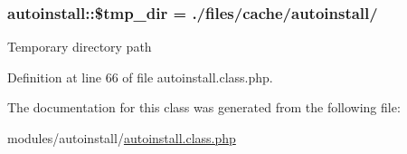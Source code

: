 \subsubsection[{\texorpdfstring{\$tmp\+\_\+dir}{$tmp_dir}}]{\setlength{\rightskip}{0pt plus 5cm}autoinstall\+::\$tmp\+\_\+dir = \textquotesingle{}./{\bf files}/cache/{\bf autoinstall}/\textquotesingle{}}\hypertarget{classautoinstall_a157882a0b8cc81818aa516880f2ba5dc}{}\label{classautoinstall_a157882a0b8cc81818aa516880f2ba5dc}
Temporary directory path 

Definition at line 66 of file autoinstall.\+class.\+php.



The documentation for this class was generated from the following file\+:\begin{DoxyCompactItemize}
\item 
modules/autoinstall/\hyperlink{autoinstall_8class_8php}{autoinstall.\+class.\+php}\end{DoxyCompactItemize}

